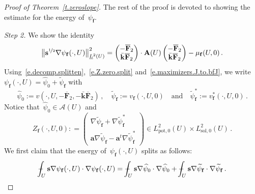 \documentclass[11pt,twoside]{article} %
\numberwithin{equation}{section}
\theoremstyle{definition}
\renewcommand*{\tilde}{\widetilde}
\renewcommand*{\hat}{\widehat}
\newcommand{\qand}{\quad \mbox{and} \quad }
\newcommand{\f}{\mathbf{f}}
\newcommand{\s}{\mathbf{s}}
\renewcommand{\a}{\mathbf{a}}
\newcommand{\khom}{\bar{\mathbf{k}}}
\def\Xint#1{\mathchoice
{\XXint\displaystyle\textstyle{#1}}%
{\XXint\textstyle\scriptstyle{#1}}%
{\XXint\scriptstyle\scriptscriptstyle{#1}}%
{\XXint\scriptscriptstyle\scriptscriptstyle{#1}}%
\!\int}
\def\XXint#1#2#3{{\setbox0=\hbox{$#1{#2#3}{\int}$}
\vcenter{\hbox{$#2#3$}}\kern-.5\wd0}}
\def\fint{\Xint-}
\newcommand{\Lsolo}{L^2_{\mathrm{sol,0}}}
\newcommand{\Lpoto}{L^2_{\mathrm{pot,0}}}
\newcommand{\bfA}{\mathbf{A}}
\newcommand{\bfF}{\mathbf{F}}
\begin{document}
\begin{proof}[{Proof of Theorem~\ref{t.zeroslope}}]
\smallskip

The rest of the proof is devoted to showing the estimate for the energy of~$\psi_{\f}$. 

\smallskip


\emph{Step 2.} We show the identity
\begin{equation} 
\label{e.energy.psi.f.pre}
\bigl\| \s^{\nicefrac 12} \nabla \psi_{\f}(\cdot,U) \bigr\|_{\underline{L}^2(U)}^2
= 
\begin{pmatrix} -\overline{\bfF}_2 \\ \khom \overline{\bfF}_2\end{pmatrix} \cdot \bfA(U) \begin{pmatrix} - \overline{\bfF}_2 \\ \khom \overline{\bfF}_2\end{pmatrix}
-  \mu_{\f}(U,0) 
\,.
\end{equation}
Using~\eqref{e.decomp.splitten},~\eqref{e.Z.zero.split} and~\eqref{e.maximizers.J.to.bfJ}, we write~$\psi_{\f}(\cdot,U) = \hat{\psi}_0 + \tilde{\psi}_{\f}$ with
\begin{equation*} 
\hat{\psi}_0:= v(\cdot,U,-\overline{\bfF}_2,-\khom \overline{\bfF}_2 )\,,  \quad
\tilde{\psi}_{\f} := v_{\f}(\cdot,U,0) \qand 
\tilde{\psi}_{\f}^* := v_{\f}^*(\cdot,U,0)
\,.
\end{equation*}
Notice that~$\hat{\psi}_0 \in \mathcal{A}(U)$ and
\begin{equation*} 
Z_{\f}(\cdot,U,0) 
: =
\begin{pmatrix} 
\nabla \tilde{\psi}_{\f}  + \nabla \tilde{\psi}_{\f}^* 
\\ 
 \a \nabla \tilde{\psi}_{\f}
- \a^t \nabla \tilde{\psi}_{\f}^*
 \end{pmatrix} 
 \in
\Lpoto(U) \times  \Lsolo(U)\,.
\end{equation*}
We first claim that the energy of~$\psi_{\f}(\cdot,U)$ splits as follows:
\begin{equation} 
\label{e.split.the.energy.with.f}
\fint_{U} \s \nabla \psi_{\f}(\cdot,U) \cdot \nabla \psi_{\f}(\cdot,U)
=
\fint_{U} \s \nabla \hat{\psi}_0 \cdot \nabla \hat{\psi}_0 
+
\fint_{U} \s \nabla \tilde{\psi}_{\f} \cdot \nabla \tilde{\psi}_{\f}
\,.
\end{equation}

\end{proof}
\end{document}
